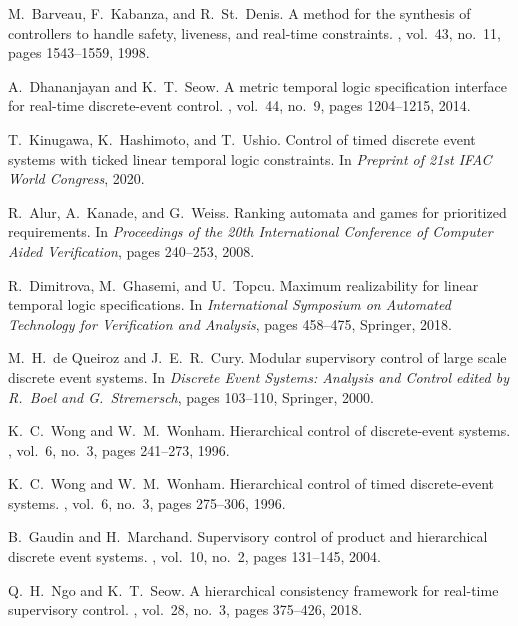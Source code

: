 \documentclass[journal,twoside,web]{IEEEtran}
\begin{document}
\begin{thebibliography}{99}
M.~Barveau, F.~Kabanza, and R.~St.~Denis.
\newblock A method for the synthesis of controllers to handle safety, liveness, and real-time constraints.
, vol.~43, no.~11, pages 1543--1559, 1998.

%
A.~Dhananjayan and K.~T.~Seow.
\newblock A metric temporal logic specification interface for real-time discrete-event control.
, vol.~44, no.~9, pages 1204--1215, 2014.

%
T.~Kinugawa, K.~Hashimoto, and T.~Ushio.
\newblock Control of timed discrete event systems with ticked linear temporal logic constraints.
\newblock In {\em Preprint of 21st IFAC World Congress}, 2020.

%
R.~Alur, A.~Kanade, and G.~Weiss.
\newblock Ranking automata and games for prioritized requirements.
\newblock In {\em Proceedings of the 20th International Conference of Computer Aided Verification}, pages 240--253, 2008.

%
R.~Dimitrova, M.~Ghasemi, and U.~Topcu.
\newblock Maximum realizability for linear temporal logic specifications.
\newblock In {\em International Symposium on Automated Technology for Verification and Analysis}, pages 458--475, Springer, 2018.

%
M.~H.~de Queiroz and J.~E.~R.~Cury.
\newblock Modular supervisory control of large scale discrete event systems.
\newblock In {\em Discrete Event Systems:  Analysis and Control edited by R.\ Boel and G.\ Stremersch}, pages 103--110, Springer, 2000.

%
K.~C.~Wong and W.~M.~Wonham.
\newblock Hierarchical control of discrete-event systems.
, vol.~6, no.~3, pages 241--273, 1996.

%
K.~C.~Wong and W.~M.~Wonham.
\newblock Hierarchical control of timed discrete-event systems.
, vol.~6, no.~3, pages 275--306, 1996.

B.~Gaudin and H.~Marchand.
\newblock Supervisory control of product and hierarchical discrete event systems.
, vol.~10, no.~2, pages 131--145, 2004.

%
Q.~H.~Ngo and K.~T.~Seow.
\newblock A hierarchical consistency framework for real-time supervisory control.
, vol.~28, no.~3, pages 375--426, 2018.


\end{thebibliography}
\end{document}
